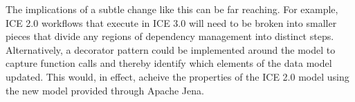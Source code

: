 The implications of a subtle change like this can be far reaching. For example,
ICE 2.0 workflows that execute in ICE 3.0 will need to be broken into smaller
pieces that divide any regions of dependency management into distinct steps.
Alternatively, a decorator pattern could be implemented around the model to
capture function calls and thereby identify which elements of the data model
updated. This would, in effect, acheive the properties of the ICE 2.0 model
using the new model provided through Apache Jena.
